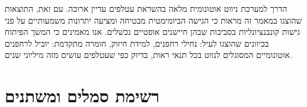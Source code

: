 הדרך למערכת ניווט אוטונומית מלאה בהשראת עטלפים עדיין ארוכה. עם זאת, התוצאות שהוצגו במאמר זה מראות כי הגישה הביומימטית מבטיחה ומציעה יתרונות משמעותיים על פני גישות קונבנציונליות בסביבות שבהן חיישנים אופטיים נכשלים. אנו מאמינים כי המשך הפיתוח בכיוונים שהוצגו לעיל: נחילי רחפנים, למידת חיזוק, חומרה מתקדמת: יוביל לרחפנים אוטונומיים המסוגלים לנווט בכל תנאי ראות, בדיוק כפי שעטלפים עושים מזה מיליוני שנים. \cite{GriffinBatEcholocation} \cite{MossEcholocation}


\appendix
\section{רשימת סמלים ומשתנים}
\label{sec:ch09_appendix}

